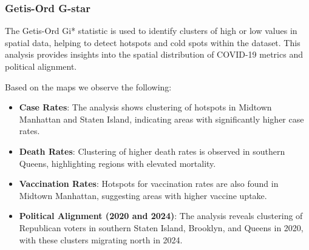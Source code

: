 \documentclass[10pt,journal,compsoc]{IEEEtran}
\begin{document}
\subsubsection{Getis-Ord G-star}

The Getis-Ord Gi* statistic is used to identify clusters of high or low values in spatial data, helping to detect hotspots and cold spots within the dataset. This analysis provides insights into the spatial distribution of COVID-19 metrics and political alignment.

Based on the maps we observe the following:
\begin{itemize}
    \item \textbf{Case Rates}: The analysis shows clustering of hotspots in Midtown Manhattan and Staten Island, indicating areas with significantly higher case rates.
    \item \textbf{Death Rates}: Clustering of higher death rates is observed in southern Queens, highlighting regions with elevated mortality.
    \item \textbf{Vaccination Rates}: Hotspots for vaccination rates are also found in Midtown Manhattan, suggesting areas with higher vaccine uptake.
    \item \textbf{Political Alignment (2020 and 2024)}: The analysis reveals clustering of Republican voters in southern Staten Island, Brooklyn, and Queens in 2020, with these clusters migrating north in 2024.
\end{itemize}
\end{document}
